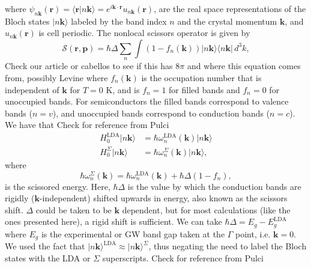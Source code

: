 where $\psi_{n\mathbf{k}}(\mathbf{r}) = \langle\mathbf{r}|n\mathbf{k}\rangle =
e^{i\mathbf{k}\cdot\mathbf{r}}u_{n\mathbf{k}}(\mathbf{r})$, are the real space
representations of the Bloch states $|n\mathbf{k}\rangle$ labeled by the band
index $n$ and the crystal momentum $\mathbf{k}$, and
$u_{n\mathbf{k}}(\mathbf{r})$ is cell periodic. The nonlocal scissors operator
is given by
\begin{equation}\label{chon.0}
\mathcal{S}(\mathbf{r},\mathbf{p}) = 
\hbar\Delta\sum_{n}
\int(1 - f_{n}(\mathbf{k}))\vert n\mathbf{k}\rangle \langle n\mathbf{k}\vert
\,d^{3}k,
\end{equation}
{\color{red} Check our article or cabellos to see if this has $8\pi$ and where this equation comes from, possibly Levine}
where $f_{n}(\mathbf{k})$ is the occupation number that is independent of
$\mathbf{k}$ for $T = 0$ K, and is $f_{n} = 1$ for filled bands and $f_{n} = 0$
for unoccupied bands. For semiconductors the filled bands correspond to valence
bands ($n = v$), and unoccupied bands correspond to conduction bands ($n = c$).
We have that
{\color{red} Check for reference from Pulci}
\begin{equation}\label{chon.1}
\begin{split}
H^\mathrm{LDA}_{0}\vert n\mathbf{k}\rangle
    &= \hbar\omega^{\mathrm{LDA}}_{n}(\mathbf{k})\vert n\mathbf{k}\rangle\\
H^{\Sigma}_{0}\vert n\mathbf{k}\rangle
    &= \hbar\omega^{\Sigma}_{n}(\mathbf{k})\vert n\mathbf{k}\rangle,
\end{split}
\end{equation} 
where 
\begin{equation}\label{chon.78}
\hbar\omega^{\Sigma}_{n}(\mathbf{k})
= \hbar\omega^{\mathrm{LDA}}_{n}(\mathbf{k}) + \hbar\Delta(1 - f_{n}),
\end{equation}
is the scissored energy. Here, $\hbar\Delta$ is the value by which the
conduction bands are rigidly ($\mathbf{k}$-independent) shifted upwards in
energy, also known as the scissors shift. $\Delta$ could be taken to be
$\mathbf{k}$ dependent, but for most calculations (like the ones presented
here), a rigid shift is sufficient. We can take $\hbar\Delta = E_{g} -
E_{g}^\mathrm{LDA}$ where $E_{g}$ is the experimental or GW band gap taken at
the $\Gamma$ point, i.e. $\mathbf{k} = 0$. We used the fact that $\vert
n\mathbf{k}\rangle^\mathrm{LDA} \approx \vert n\mathbf{k}\rangle^\Sigma$, thus
negating the need to label the Bloch states with the LDA or $\Sigma$
superscripts.
{\color{red} Check for reference from Pulci}
